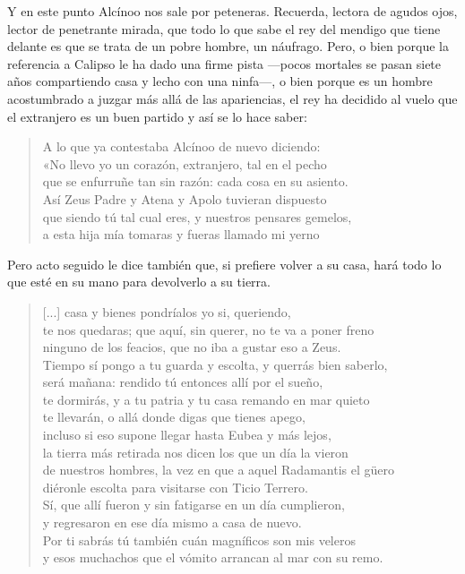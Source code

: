 \documentclass[11pt,a4paper]{article}
\begin{document}
Y en este punto Alcínoo nos sale por peteneras. Recuerda, lectora de agudos ojos, lector de penetrante mirada, que todo lo que sabe el rey del mendigo que tiene delante es que se trata de un pobre hombre, un náufrago. Pero, o bien porque la referencia a Calipso le ha dado una firme pista ---pocos mortales se pasan siete años compartiendo casa y lecho con una ninfa---, o bien porque es un hombre acostumbrado a juzgar más allá de las apariencias, el rey ha decidido al vuelo que el extranjero es un buen partido y así se lo hace saber:

\begin{verse}
A lo que ya contestaba Alcínoo de nuevo diciendo:\\
«No llevo yo un corazón, extranjero, tal en el pecho\\
que se enfurruñe tan sin razón: cada cosa en su asiento.\\
Así Zeus Padre y Atena y Apolo tuvieran dispuesto\\
que siendo tú tal cual eres, y nuestros pensares gemelos,\\
a esta hija mía tomaras y fueras llamado mi yerno
\end{verse}

Pero acto seguido le dice también que, si prefiere volver a su casa, hará todo lo que esté en su mano para devolverlo a su tierra.

\begin{verse}
[...] casa y bienes pondríalos yo si, queriendo,\\
te nos quedaras; que aquí, sin querer, no te va a poner freno\\
ninguno de los feacios, que no iba a gustar eso a Zeus.\\
Tiempo sí pongo a tu guarda y escolta, y querrás bien saberlo,\\
será mañana: rendido tú entonces allí por el sueño,\\
te dormirás, y a tu patria y tu casa remando en mar quieto\\
te llevarán, o allá donde digas que tienes apego,\\
incluso si eso supone llegar hasta Eubea y más lejos,\\
la tierra más retirada nos dicen los que un día la vieron\\
de nuestros hombres, la vez en que a aquel Radamantis el güero\\
diéronle escolta para visitarse con Ticio Terrero.\\
Sí, que allí fueron y sin fatigarse en un día cumplieron,\\
y regresaron en ese día mismo a casa de nuevo.\\
Por ti sabrás tú también cuán magníficos son mis veleros\\
y esos muchachos que el vómito arrancan al mar con su remo.
\end{verse}
\end{document}
